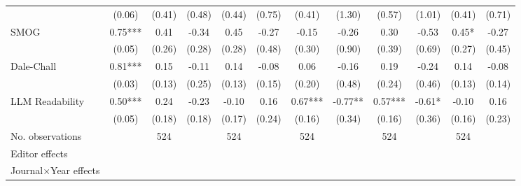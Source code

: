 \begin{table}
\begin{threeparttable}
\begin{tabular}{p{3cm}S@{}S@{}S@{}S@{}S@{}S@{}S@{}S@{}S@{}S@{}S@{}}
                                          &      (0.06)   &      (0.41)   &      (0.48)   &      (0.44)   &      (0.75)   &      (0.41)   &      (1.30)   &      (0.57)   &      (1.01)   &      (0.41)   &      (0.71)   \\
            SMOG                          &        0.75***&        0.41   &       -0.34   &        0.45   &       -0.27   &       -0.15   &       -0.26   &        0.30   &       -0.53   &        0.45*  &       -0.27   \\
                                          &      (0.05)   &      (0.26)   &      (0.28)   &      (0.28)   &      (0.48)   &      (0.30)   &      (0.90)   &      (0.39)   &      (0.69)   &      (0.27)   &      (0.45)   \\
            Dale-Chall                    &        0.81***&        0.15   &       -0.11   &        0.14   &       -0.08   &        0.06   &       -0.16   &        0.19   &       -0.24   &        0.14   &       -0.08   \\
                                          &      (0.03)   &      (0.13)   &      (0.25)   &      (0.13)   &      (0.15)   &      (0.20)   &      (0.48)   &      (0.24)   &      (0.46)   &      (0.13)   &      (0.14)   \\
            LLM Readability               &        0.50***&        0.24   &       -0.23   &       -0.10   &        0.16   &        0.67***&       -0.77** &        0.57***&       -0.61*  &       -0.10   &        0.16   \\
                                          &      (0.05)   &      (0.18)   &      (0.18)   &      (0.17)   &      (0.24)   &      (0.16)   &      (0.34)   &      (0.16)   &      (0.36)   &      (0.16)   &      (0.23)   \\
            \midrule
            No. observations              &               &         524   &               &         524   &               &         524   &               &         524   &               &         524   &               \\
            \midrule
            Editor effects       &               &           {}   &               &           {}   &               &           {}   &               &           {}   &               &               &               \\
            Journal\(\times\)Year effects          &               &           {}   &               &           {}   &               &           {}   &               &           {}   &               &               &               \\

\end{tabular}
\end{threeparttable}
\end{table}
